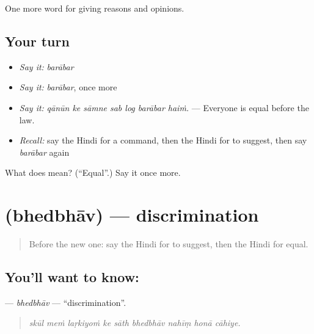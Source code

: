 \begin{grammarlens}[title={What you've built}]
One more word for giving reasons and opinions.
\end{grammarlens}

\subsection*{Your turn}
\begin{itemize}
\raggedright
  \item \emph{Say it:} \emph{barābar}
  \item \emph{Say it:} \emph{barābar}, once more
  \item \emph{Say it:} \emph{qānūn ke sāmne sab log barābar haiṁ.} — Everyone is equal before the law.
  \item \emph{Recall:} say the Hindi for a command, then the Hindi for to suggest, then say \emph{barābar} again
\end{itemize}

\begin{tcolorbox}[breakable,colback=teal!4,colframe=teal!35!black,title={Before you move on}]
What does  mean? (\textquotedblleft{}Equal\textquotedblright{}.) Say it once more.
\end{tcolorbox}
\section[\texorpdfstring{\hi{भेदभाव} (bhedbhāv)}{भेदभाव (bhedbhāv)}]{ (bhedbhāv) — discrimination}

\label{lesson:HI-C356-bhedbhav}



\begin{quote}
Before the new one: say the Hindi for to suggest, then the Hindi for equal.
\end{quote}

\subsection*{You'll want to know: }
\textbf{} — \emph{bhedbhāv} — \textquotedblleft{}discrimination\textquotedblright{}.

\begin{quote}
        
\end{quote}

\begin{quote}
\emph{skūl meṁ laṛkiyoṁ ke sāth bhedbhāv nahīṃ honā cāhiye.}
\end{quote}

